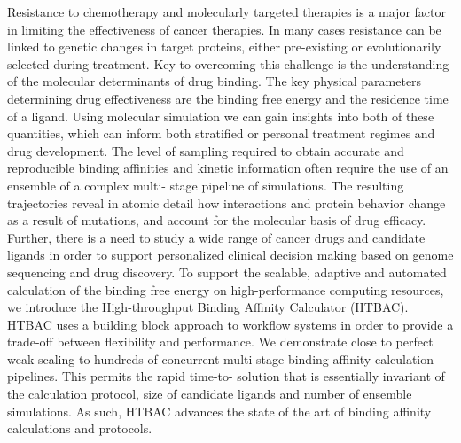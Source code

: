 Resistance to chemotherapy and molecularly targeted therapies is a major
factor in limiting the effectiveness of cancer therapies. In many cases
resistance can be linked to genetic changes in target proteins, either 
pre-existing or evolutionarily selected during treatment. Key to overcoming this
challenge is the understanding of the molecular determinants of drug binding.
The key physical parameters determining drug effectiveness are the binding
free energy and the residence time of a ligand. Using molecular simulation we
can gain insights into both of these quantities, which can inform both
stratified or personal treatment regimes and drug development. The level of
sampling required to obtain accurate and reproducible binding affinities and
kinetic information often require the use of an ensemble of a complex multi-
stage pipeline of simulations. The resulting trajectories reveal in atomic
detail how interactions and protein behavior change as a result of mutations,
and account for the molecular basis of drug efficacy. Further, there is a need
to study a wide range of cancer drugs and candidate ligands in order to
support personalized clinical decision making based on genome sequencing and
drug discovery. To support the scalable, adaptive and automated calculation of
the binding free energy on high-performance computing resources, we introduce
the High-throughput Binding Affinity Calculator (HTBAC). HTBAC uses a building
block approach to workflow systems in order to provide a trade-off between
flexibility and performance. We demonstrate close to perfect weak scaling to
hundreds of concurrent multi-stage binding affinity calculation pipelines.
This permits the rapid time-to- solution that is essentially invariant of the
calculation protocol, size of candidate ligands and number of ensemble
simulations. As such, HTBAC advances the state of the art of binding affinity
calculations and protocols.






